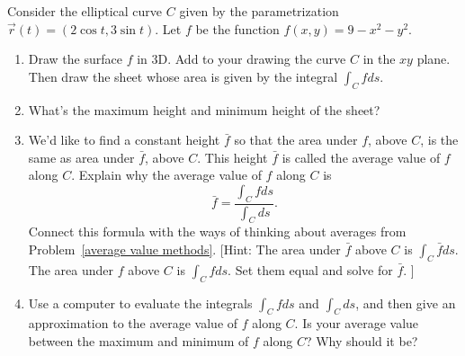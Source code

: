 \begin{problem}\label{Average Value intro}%
%
 Consider the elliptical curve $C$ given by the parametrization $\vec r(t) = (2\cos t, 3\sin t)$.  Let $f$ be the function $f(x,y)=9-x^2-y^2$.    \begin{enumerate}
  \item Draw the surface $f$ in 3D.  Add to your drawing the curve $C$ in the $xy$ plane. Then draw the sheet whose area is given by the integral $\int_C f ds$. 
  \item What's the maximum height and minimum height of the sheet? 
  \item We'd like to find a constant height $\bar f$ so that the area under $f$, above $C$, is the same as area under $\bar f$, above $C$. This height $\bar f$ is called the average value of $f$ along $C$. 
{}%
Explain why the average value of $f$ along $C$ is 
$$\bar f = \frac{\int_C f ds}{\int_C ds}.$$
Connect this formula with the ways of thinking about averages from Problem~\ref{average value methods}.
[Hint: The area under $\bar f$ above $C$ is $\int_C \bar f ds$. The area under $f$ above $C$ is $\int_C f ds$. Set them equal and solve for $\bar f$. ]  
  \item 
{}%
Use a computer to evaluate the integrals $\int_C f ds$ and $\int_C ds$, and then give an approximation to the average value of $f$ along $C$. Is your average value between the maximum and minimum of $f$ along $C$? Why should it be?
 \end{enumerate}
\end{problem}

